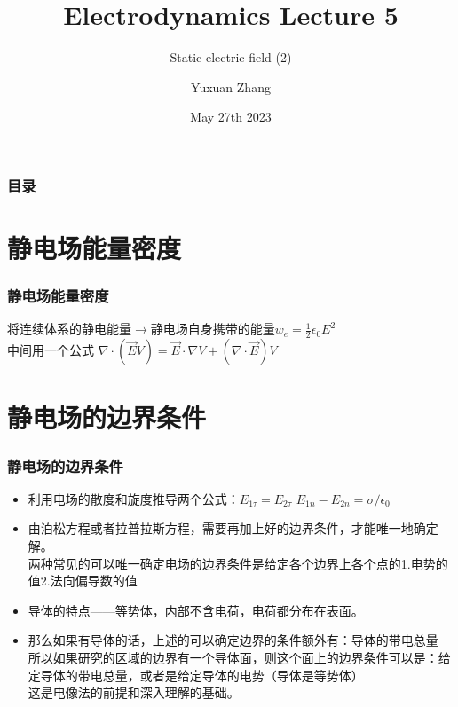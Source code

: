 \documentclass[10pt]{beamer}
\title[About Beamer] %
{Electrodynamics Lecture 5}
\subtitle{Static electric field (2) }
\author %
{Yuxuan Zhang }
\institute[VFU] %
{
  School of Physics \quad
  Zhejiang University
}
\date[VLC 2021] %
{May 27th 2023}
\begin{document}
\frame{\titlepage}

\begin{frame}
    \frametitle{目录}
    \tableofcontents
\end{frame}

\section{静电场能量密度}
\begin{frame}
    \frametitle{静电场能量密度}
    将连续体系的静电能量$\rightarrow$静电场自身携带的能量$w_e =\frac{1}{2} \epsilon_0 E^2$
    \\ 中间用一个公式 $\nabla \cdot (\vec{E} V) =  \vec{E}\cdot \nabla V + (\nabla \cdot \vec{E}) V$
\end{frame}

\section{静电场的边界条件}
\begin{frame}
  \frametitle{静电场的边界条件}
  \begin{itemize}
    \item   利用电场的散度和旋度推导两个公式：${E_{1\tau}} = {E_{2\tau}}$ ${E_{1n}} - {E_{2n}} = \sigma /\epsilon_0$

    \item 由泊松方程或者拉普拉斯方程，需要再加上好的边界条件，才能唯一地确定解。\\
  两种常见的可以唯一确定电场的边界条件是给定各个边界上各个点的1.电势的值2.法向偏导数的值\\
  
  \item 导体的特点——等势体，内部不含电荷，电荷都分布在表面。\\
  
  \item 那么如果有导体的话，上述的可以确定边界的条件额外有：导体的带电总量\\
  所以如果研究的区域的边界有一个导体面，则这个面上的边界条件可以是：给定导体的带电总量，或者是给定导体的电势（导体是等势体）
  \\这是电像法的前提和深入理解的基础。
  \end{itemize}
\end{frame}
\end{document}
